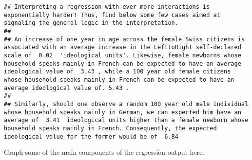 \documentclass[
]{book}
\begin{document}
\begin{verbatim}
## Interpreting a regression with ever more interactions is exponentially harder! Thus, find below some few cases aimed at signaling the general logic in the interpretation. 
## 
## An increase of one year in age across the female Swiss citizens is associated with an average increase in the LeftToRight self-declared scale of  0.02  'ideological units'. Likewise, female newborns whose household speaks mainly in French can be expected to have an average ideological value of  3.43 , while a 100 year old female citizens whose household speaks mainly in French can be expected to have an average ideological value of. 5.43 .
## 
## Similarly, should one observe a random 100 year old male individual whose household speaks mainly in German, we can expected him have an average of  3.41  ideological units higher than a female newborn whose household speaks mainly in French. Consequently, the expected ideological value for the former would be of  6.84
\end{verbatim}

Graph some of the main components of the regression output here.
\end{document}
